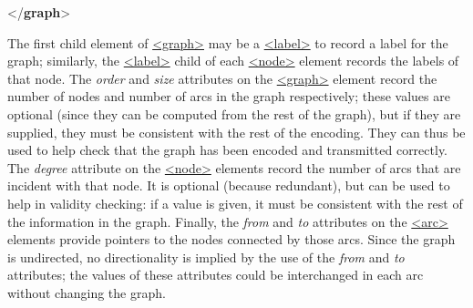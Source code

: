 \begin{shaded}
\mbox{}\newline 
{}\mbox{}\newline 
{}\mbox{}\newline 
{}\mbox{}\newline 
{</\textbf{graph}>}\end{shaded}\egroup\par \par
The first child element of \hyperref[TEI.graph]{<graph>} may be a \hyperref[TEI.label]{<label>} to record a label for the graph; similarly, the \hyperref[TEI.label]{<label>} child of each \hyperref[TEI.node]{<node>} element records the labels of that node. The {\itshape order} and {\itshape size} attributes on the \hyperref[TEI.graph]{<graph>} element record the number of nodes and number of arcs in the graph respectively; these values are optional (since they can be computed from the rest of the graph), but if they are supplied, they must be consistent with the rest of the encoding. They can thus be used to help check that the graph has been encoded and transmitted correctly. The {\itshape degree} attribute on the \hyperref[TEI.node]{<node>} elements record the number of arcs that are incident with that node. It is optional (because redundant), but can be used to help in validity checking: if a value is given, it must be consistent with the rest of the information in the graph. Finally, the {\itshape from} and {\itshape to} attributes on the \hyperref[TEI.arc]{<arc>} elements provide pointers to the nodes connected by those arcs. Since the graph is undirected, no directionality is implied by the use of the {\itshape from} and {\itshape to} attributes; the values of these attributes could be interchanged in each arc without changing the graph.\par
